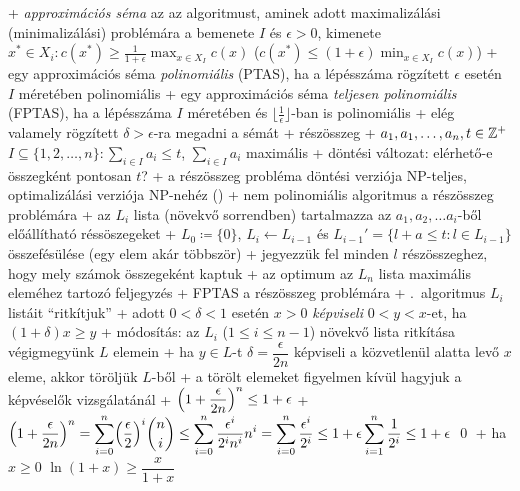 + \dfn \emph{approximációs séma} az az algoritmust, aminek adott
  maximalizálási (minimalizálási) problémára a bemenete $I$ és
  $\epsilon > 0$, kimenete $x^* \in X_i : c(x^*) \ge \frac{1}{1 +
    \epsilon} \max_{x \in X_I} c(x)$ ($c(x^*) \le (1 +
    \epsilon) \min_{x \in X_I} c(x)$)
+ \dfn egy approximációs séma \emph{polinomiális} (PTAS), ha a lépésszáma
  rögzített $\epsilon$ esetén $I$ méretében polinomiális
+ \dfn egy approximációs séma \emph{teljesen polinomiális} (FPTAS), ha a
  lépésszáma $I$ méretében és $\bigl\lfloor \frac{1}{\epsilon}
  \bigr\rfloor$-ban is polinomiális
  + elég valamely rögzített $\delta > \epsilon$-ra megadni a sémát
+ \prob részösszeg
  + \DataIn $a_1, a_1, \ldots, a_n, t \in \mathbb{Z}^+$\qquad
    \DataOut $I \subseteq \{1, 2, \ldots, n\} : \sum_{i \in I} a_i \le
    t$, $\sum_{i \in I} a_i$ maximális
    + döntési változat: elérhető-e összegként pontosan $t$?
  + \thm a részösszeg probléma döntési verziója NP-teljes,
    optimalizálási verziója NP-nehéz (\noproof)
+ \alg \label{alg:koztelito:fptas:nempol}nem polinomiális algoritmus a részösszeg problémára
  + az $L_i$ lista (növekvő sorrendben) tartalmazza az $a_1, a_2,
    \ldots a_i$-ből előállítható réssöszegeket
    + $L_0 \coloneqq \{0\}$, $L_i \gets L_{i - 1}$ és $L_{i - 1}' = \{l +
      a \le t : l \in L_{i - 1}\}$ összefésülése (egy elem akár
      többször)
    + jegyezzük fel minden $l$ részösszeghez, hogy mely számok
      összegeként kaptuk
    + az optimum az $L_n$ lista maximális eleméhez tartozó feljegyzés
+ \alg \label{alg:koztelito:fptas:fptas}FPTAS a részösszeg problémára
  + .~algoritmus $L_i$ listáit
    ``ritkítjuk''
  + \dfn adott $0 < \delta < 1$ esetén $x > 0$ \emph{képviseli} $0 < y <
    x$-et, ha $(1 + \delta) x \ge y$
  + módosítás: az $L_i$ ($1 \le i \le n - 1$) növekvő lista ritkítása
    \RA végigmegyünk $L$ elemein
    + ha $y \in L$-t $\delta = \dfrac{\epsilon}{2n}$ képviseli a
      közvetlenül alatta levő $x$ eleme, akkor töröljük $L$-ből
    + a törölt elemeket figyelmen kívül hagyjuk a képvéselők
      vizsgálatánál
+ \lemma \label{lem:koztelito:fptas:epszilon1}$\displaystyle \mleft(
  1 + \frac{\epsilon}{2n} \mright)^n \le 1 + \epsilon$
  + \proof $\displaystyle \mleft(1 + \frac{\epsilon}{2n} \mright)^n = \sum_{i = 0}^n
    \mleft(\frac{\epsilon}{2}\mright)^i \binom{n}{i} \le \sum_{i = 0}^n
    \frac{\epsilon^i}{2^i n^i} n^i = \sum_{i = 0}^n
    \frac{\epsilon^i}{2^i} \le 1 + \epsilon \sum_{i = 1}^n
    \frac{1}{2^i} \le 1 + \epsilon$ \qed
+ \lemma \label{lem:koztelito:fptas:epszilon2}ha $x \ge 0$ \RA $\ln (1 + x) \ge \dfrac{x}{1 + x}$
